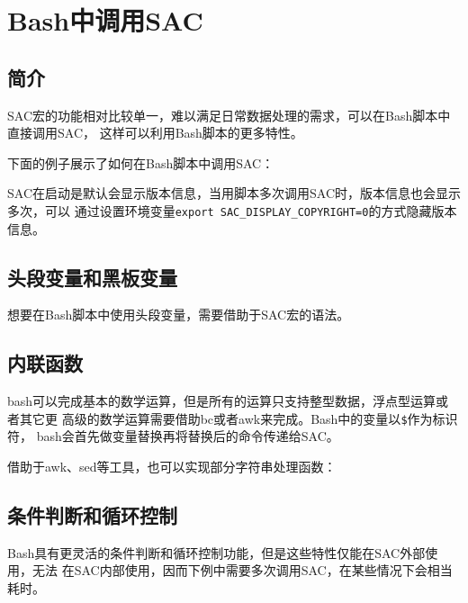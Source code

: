 \section{Bash中调用SAC}

\subsection{简介}
SAC宏的功能相对比较单一，难以满足日常数据处理的需求，可以在Bash脚本中直接调用SAC，
这样可以利用Bash脚本的更多特性。

下面的例子展示了如何在Bash脚本中调用SAC：


SAC在启动是默认会显示版本信息，当用脚本多次调用SAC时，版本信息也会显示多次，可以
通过设置环境变量\lstinline{export SAC_DISPLAY_COPYRIGHT=0}的方式隐藏版本信息。

\subsection{头段变量和黑板变量}
想要在Bash脚本中使用头段变量，需要借助于SAC宏的语法。


\subsection{内联函数}
bash可以完成基本的数学运算，但是所有的运算只支持整型数据，浮点型运算或者其它更
高级的数学运算需要借助bc或者awk来完成。Bash中的变量以\lstinline{$}作为标识符，
bash会首先做变量替换再将替换后的命令传递给SAC。


借助于awk、sed等工具，也可以实现部分字符串处理函数：


\subsection{条件判断和循环控制}
Bash具有更灵活的条件判断和循环控制功能，但是这些特性仅能在SAC外部使用，无法
在SAC内部使用，因而下例中需要多次调用SAC，在某些情况下会相当耗时。

